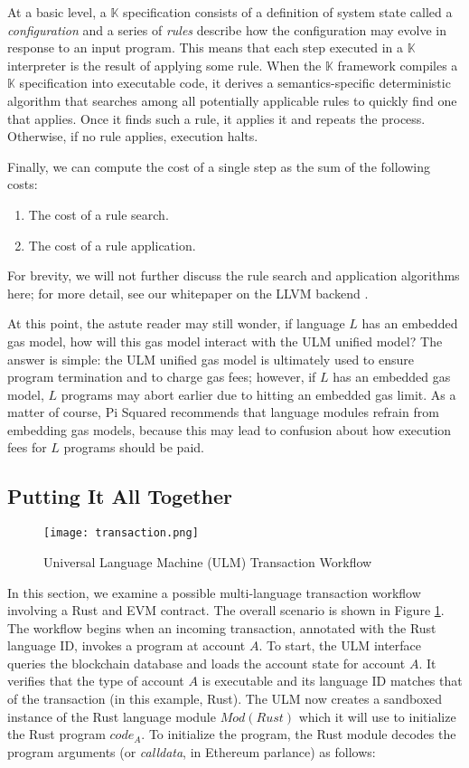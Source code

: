 \documentclass{article}
\newcommand{\ulm}{{ULM}}
\newcommand{\K}{\ensuremath{\mathbb{K}}}
\newcommand{\ps}{Pi Squared}
\begin{document}
At a basic level, a \K{} specification consists of a definition of system state called a \emph{configuration} and a series of \emph{rules} describe how the configuration may evolve in response to an input program.
This means that each step executed in a \K{} interpreter is the result of applying some rule.
When the \K{} framework compiles a \K{} specification into executable code, it derives a semantics-specific deterministic algorithm that searches among all potentially applicable rules to quickly find one that applies.
Once it finds such a rule, it applies it and repeats the process.
Otherwise, if no rule applies, execution halts.

Finally, we can compute the cost of a single step as the sum of the following costs:

\begin{enumerate}
    \item The cost of a rule search.
    \item The cost of a rule application.
\end{enumerate}

\noindent For brevity, we will not further discuss the rule search and application algorithms here; for more detail, see our whitepaper on the LLVM backend \cite{llvm-backend}.

At this point, the astute reader may still wonder, if language $L$ has an embedded gas model, how will this gas model interact with the \ulm{} unified model?
The answer is simple: the \ulm{} unified gas model is ultimately used to ensure program termination and to charge gas fees; however, if $L$ has an embedded gas model, $L$ programs may abort earlier due to hitting an embedded gas limit.
As a matter of course, \ps{} recommends that language modules refrain from embedding gas models, because this may lead to confusion about how execution fees for $L$ programs should be paid.


\subsection{Putting It All Together}

\begin{figure}
    \centering
    \texttt{[image: transaction.png]}
    \caption{Universal Language Machine (ULM) Transaction Workflow}
    \label{fig:ulm-tx}
\end{figure}

In this section, we examine a possible multi-language transaction workflow involving a Rust and EVM contract.
The overall scenario is shown in Figure \ref{fig:ulm-tx}.
The workflow begins when an incoming transaction, annotated with the Rust language ID, invokes a program at account $A$.
To start, the \ulm{} interface queries the blockchain database and loads the account state for account $A$.
It verifies that the type of account $A$ is executable and its language ID matches that of the transaction (in this example, Rust).
The \ulm{} now creates a sandboxed instance of the Rust language module $Mod(Rust)$ which it will use to initialize the Rust program $code_A$.
To initialize the program, the Rust module decodes the program arguments (or \emph{calldata}, in Ethereum parlance) as follows:
\end{document}
